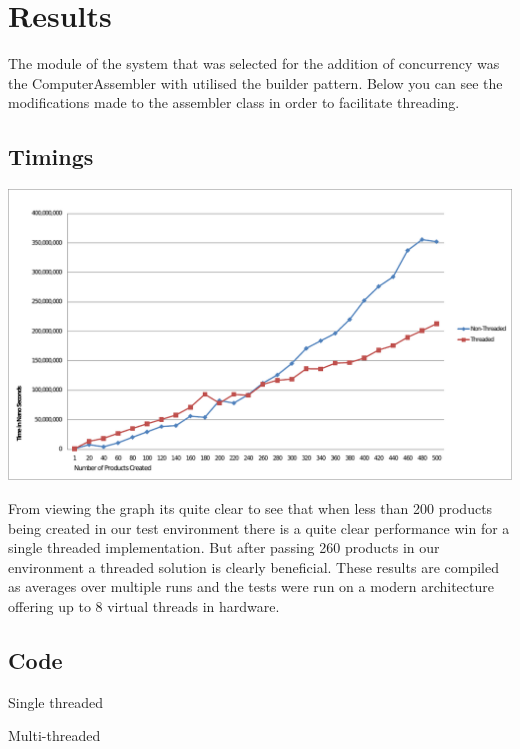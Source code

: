 \documentclass[pdftex,11pt,a4paper]{article}
\begin{document}
\pagebreak
\section{Results}
The module of the system that was selected for the addition of concurrency was the ComputerAssembler with utilised the builder pattern. Below you can see the modifications made to the assembler class in order to facilitate threading.

\subsection{Timings}
\begin{center}
	\includegraphics[scale=0.9,angle=0]{graph.pdf}
\end{center}
From viewing the graph its quite clear to see that when less than 200 products being created in our test environment there is a quite clear performance win for a single threaded implementation. But after passing 260 products in our environment a threaded solution is clearly beneficial. These results are compiled as averages over multiple runs and the tests were run on a modern architecture offering up to 8 virtual threads in hardware.
\pagebreak
\subsection{Code}

Single threaded

Multi-threaded

\pagebreak
\end{document}
